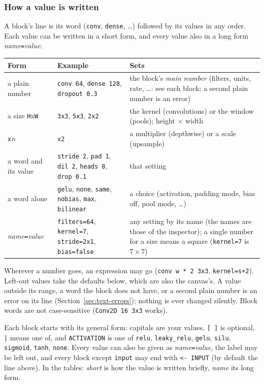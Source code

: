 \subsubsection*{How a value is written}
A block's line is its word (\texttt{conv}, \texttt{dense}, \dots) followed by its values in any order. Each value can be written in a
short form, and every value also in a long form \emph{name}\texttt{=}\emph{value}:
\begin{longtable}{@{}p{3.6cm}p{5.2cm}p{6.2cm}@{}}
\toprule
\textbf{Form} & \textbf{Example} & \textbf{Sets}\\
\midrule\endhead
a plain number & \texttt{conv 64}, \texttt{dense 128}, \texttt{dropout 0.3} & the block's \emph{main number} (filters, units, rate, \dots: see each block; a second plain number is an error)\\
a size \texttt{H}x\texttt{W} & \texttt{3x3}, \texttt{5x3}, \texttt{2x2} & the kernel (convolutions) or the window (pools); height $\times$ width\\
\texttt{x}\emph{n} & \texttt{x2} & a multiplier (depthwise) or a scale (upsample)\\
a word and its value & \texttt{stride 2}, \texttt{pad 1}, \texttt{dil 2}, \texttt{heads 8}, \texttt{drop 0.1} & that setting\\
a word alone & \texttt{gelu}, \texttt{none}, \texttt{same}, \texttt{nobias}, \texttt{max}, \texttt{bilinear} & a choice (activation, padding mode, bias off, pool mode, \dots)\\
\emph{name}\texttt{=}\emph{value} & \texttt{filters=64}, \texttt{kernel=7}, \texttt{stride=2x1}, \texttt{bias=false} & any setting by its name (the names are those of the inspector); a single number for a size means a square (\texttt{kernel=7} is $7\times7$)\\
\bottomrule
\end{longtable}
Wherever a number goes, an expression may go (\texttt{conv w * 2 3x3}, \texttt{kernel=s+2}). Left-out values take the defaults below,
which are also the canvas's. A value outside its range, a word the block does not have, or a second plain number is an error on its line
(Section~\ref{sec:text-errors}); nothing is ever changed silently. Block words are not case-sensitive (\texttt{Conv2D 16 3x3} works).

Each block starts with its general form: capitals are your values, \mbox{\texttt{[ ]}} is optional, \texttt{|} means one of, and
\texttt{ACTIVATION} is one of \texttt{relu}, \texttt{leaky\_relu}, \texttt{gelu}, \texttt{silu}, \texttt{sigmoid}, \texttt{tanh},
\texttt{none}. Every value can also be given as \emph{name}\texttt{=}\emph{value}, the label may be left out, and every block
except \texttt{input} may end with \texttt{<- INPUT} (by default the line above). In the tables:
\emph{short} is how the value is written briefly, \emph{name} its long form.

